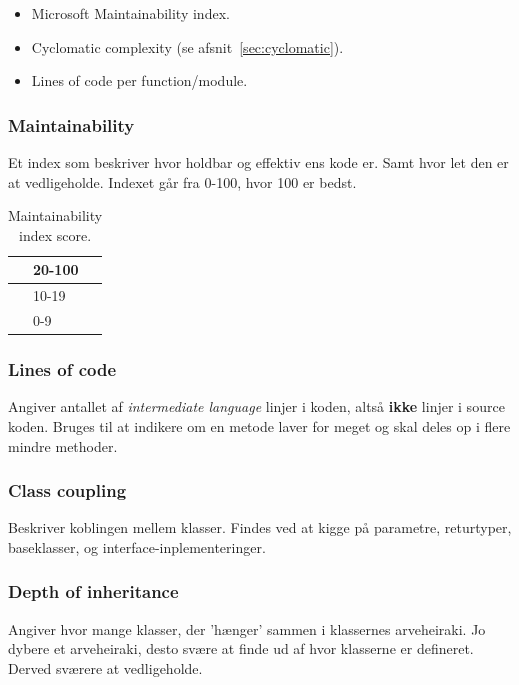 \begin{itemize}
	\item Microsoft Maintainability index.
	\item Cyclomatic complexity (se afsnit~\ref{sec:cyclomatic}).
	\item Lines of code per function/module.
\end{itemize}

\subsubsection{Maintainability}
Et index som beskriver hvor holdbar og effektiv ens kode er. Samt hvor let den er at vedligeholde. Indexet går fra 0-100, hvor 100 er bedst.

\def\arraystretch{1.5}%
\begin{table}[H]
	\centering
	\begin{tabular}{|c|l|}
		\hline
		\hspace{2cm} \cellcolor{green}& 20-100\\
		\hline
		\cellcolor{yellow}& 10-19\\
		\hline
		\cellcolor{red}& 0-9\\
		\hline
	\end{tabular}
	\caption{Maintainability index score.}
\end{table}

\subsubsection{Lines of code}
Angiver antallet af \textit{intermediate language} linjer i koden, altså \textbf{ikke} linjer i source koden. Bruges til at indikere om en metode laver for meget og skal deles op i flere mindre methoder.

\subsubsection{Class coupling}
Beskriver koblingen mellem klasser. Findes ved at kigge på parametre, returtyper, baseklasser, og interface-inplementeringer.

\subsubsection{Depth of inheritance}
Angiver hvor mange klasser, der 'hænger' sammen i klassernes arveheiraki. Jo dybere et arveheiraki, desto svære at finde ud af hvor klasserne er defineret. Derved sværere at vedligeholde.


